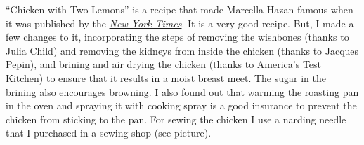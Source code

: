 \documentclass[11pt,letterpaper]{article}
\begin{document}


``Chicken with Two Lemons'' is a recipe that made Marcella Hazan famous when it was published by the \href{https://cooking.nytimes.com/recipes/1015182-marcella-hazans-roast-chicken-with-lemons}{\it New York Times}. It is a very good recipe. But, I made a few changes to it, incorporating the steps of removing the wishbones (thanks to Julia Child) and removing the kidneys from inside the chicken (thanks to Jacques Pepin), and  brining and air drying the chicken (thanks to America's Test Kitchen) to ensure that it results in a moist breast meet. The sugar in the brining also encourages browning. I also found out that warming the roasting pan in the oven and spraying it with cooking spray is a good insurance to prevent the chicken from sticking to the pan. For sewing the chicken I use a narding needle that I purchased in a sewing shop (see picture).
\end{document}
